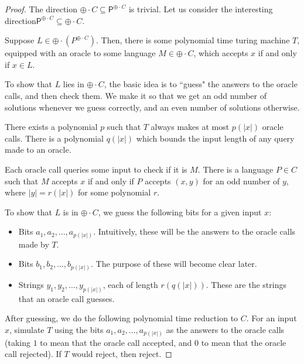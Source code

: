 \documentclass[11pt]{article}
\newcommand{\parity}{\oplus}
\newcommand{\p}{\textsf{P}}
\begin{document}
\begin{proof}
The direction $\parity \cdot C \subseteq \p^{\parity \cdot C}$ is trivial. Let us consider the interesting direction\linebreak $\p^{\parity \cdot C}\subseteq \parity\cdot C$.

Suppose $L \in \parity \cdot (P^{\parity\cdot C})$. Then, there is some polynomial time turing machine $T$, equipped with an oracle to some language $M \in \parity\cdot C$, which accepts $x$ if and only if $x\in L$.

To show that $L$ lies in $\parity\cdot C$, the basic idea is to ``guess" the answers to the oracle calls, and then check them. We make it so that we get an odd number of solutions whenever we guess correctly, and an even number of solutions otherwise.

There exists a polynomial $p$ such that $T$ always makes at most $p(|x|)$ oracle calls. There is a polynomial $q(|x|)$ which bounds the input length of any query made to an oracle.

Each oracle call queries some input to check if it is $M$. There is a language $P \in C$ such that $M$ accepts $x$ if and only if $P$ accepts $(x,y)$ for an odd number of $y$, where $|y| = r(|x|)$ for some polynomial $r$.

To show that $L$ is in $\parity \cdot C$, we guess the following bits for a given input $x$:
\begin{itemize}
\item Bits $a_1,a_2,...,a_{p(|x|)}$. Intuitively, these will be the answers to the oracle calls made by $T$.
\item Bits $b_1,b_2,...,b_{p(|x|)}$. The purpose of these will become clear later.
\item Strings $y_1,y_2,...,y_{p(|x|)}$, each of length $r(q(|x|))$. These are the strings that an oracle call guesses.
\end{itemize}
After guessing, we do the following polynomial time reduction to $C$. For an input $x$, simulate $T$ using the bits $a_1,a_2,...,a_{p(|x|)}$ as the answers to the oracle calls (taking $1$ to mean that the oracle call accepted, and $0$ to mean that the oracle call rejected). If $T$ would reject, then reject.


\end{proof}
\end{document}
